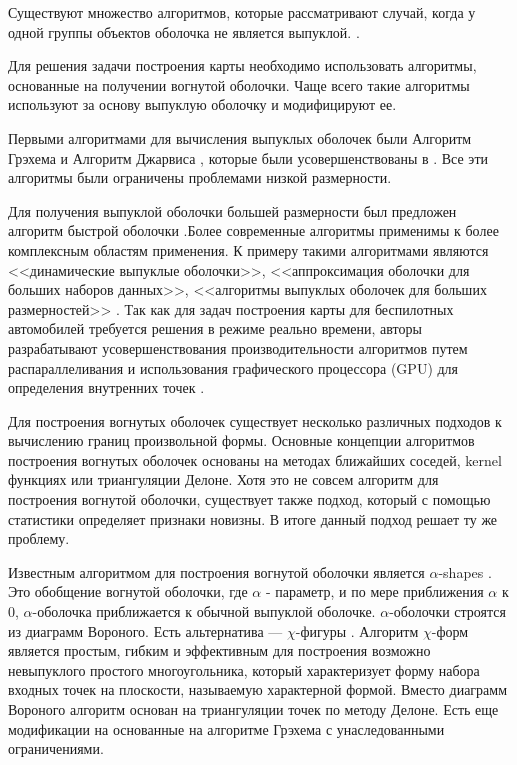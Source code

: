 Существуют множество алгоритмов, которые рассматривают случай, когда у одной группы объектов оболочка не является выпуклой. \cite{rejerHypertubePossibleInterpolation2006,j.a.leonardUsingRadialBasis1992,verleysenLearningHighdimensionalData2001}.

Для решения задачи построения карты необходимо использовать алгоритмы, основанные на получении вогнутой оболочки. Чаще всего такие алгоритмы используют за основу выпуклую оболочку и модифицируют ее.

Первыми алгоритмами для вычисления выпуклых оболочек были Алгоритм Грэхема \cite{grahamEfficientAlgorithDetermining1972} и Алгоритм Джарвиса \cite{jarvisIdentificationConvexHull1973}, которые были усовершенствованы в \cite{chanOptimalOutputsensitiveConvex1996}. Все эти алгоритмы были ограничены проблемами низкой размерности. 

Для получения выпуклой оболочки большей размерности был предложен алгоритм быстрой оболочки \cite{clarksonApplicationsRandomSampling1988}.Более современные алгоритмы применимы к более комплексным областям применения. К примеру такими алгоритмами являются <<динамические выпуклые оболочки>>, <<аппроксимация оболочки для больших наборов данных>>, <<алгоритмы выпуклых оболочек для больших размерностей>> \cite{brodalDynamicPlanarConvex2002,khosravaniSimpleAlgorithmConvex2013,zhongFindingConvexHull2014}. Так как для задач построения карты для беспилотных автомобилей требуется решения в режиме реально времени, авторы разрабатывают усовершенствования производительности алгоритмов путем распараллеливания и использования графического процессора (GPU) для определения внутренних точек \cite{zhongFindingConvexHull2014,cintraSpeculativeParallelizationRandomized2004,cintraSpeculativeParallelizationRandomized2004,tangSMI2012Full2012,tzengFindingConvexHulls2012}.

Для построения вогнутых оболочек существует несколько различных подходов к вычислению границ произвольной формы. Основные концепции алгоритмов построения вогнутых оболочек основаны на методах ближайших соседей, kernel функциях или триангуляции Делоне. Хотя это не совсем алгоритм для построения вогнутой оболочки, существует также подход, который с помощью статистики определяет признаки новизны. В итоге данный подход решает ту же проблему. 

Известным алгоритмом для построения вогнутой оболочки является $\alpha$-shapes \cite{edelsbrunnerShapeSetPoints1983,edelsbrunnerThreedimensionalAlphaShapes1992}. Это обобщение вогнутой оболочки, где $\alpha$ - параметр, и по мере приближения $\alpha$ к 0, $\alpha$-оболочка приближается к обычной выпуклой оболочке. $\alpha$-оболочки строятся из диаграмм Вороного. Есть альтернатива --- $\chi$-фигуры \cite{duckhamEfficientGenerationSimple2008}. Алгоритм $\chi$-форм является простым, гибким и эффективным для построения возможно невыпуклого простого многоугольника, который характеризует форму набора входных точек на плоскости, называемую характерной формой. Вместо диаграмм Вороного алгоритм основан на триангуляции точек по методу Делоне. Есть еще модификации на основанные на алгоритме Грэхема \cite{xuConcaveHullAlgorithm2010} с унаследованными ограничениями. 

